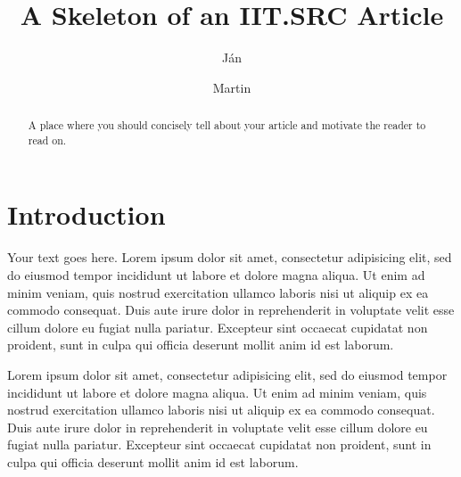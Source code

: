 \documentclass{iitsrc}
\title{A Skeleton of an IIT.SRC Article}
\author{Ján}{Novák}
\author{Martin}{Kováč}
\begin{document}
\begin{abstract}
A place where you should concisely tell about your article and motivate
the reader to read on.
\end{abstract}
\section{Introduction}
Your text goes here. Lorem ipsum dolor sit amet, consectetur adipisicing elit, sed do eiusmod tempor incididunt ut labore et dolore magna aliqua. Ut enim ad minim veniam, quis nostrud exercitation ullamco laboris nisi ut aliquip ex ea commodo consequat. Duis aute irure dolor in reprehenderit in voluptate velit esse cillum dolore eu fugiat nulla pariatur. Excepteur sint occaecat cupidatat non proident, sunt in culpa qui officia deserunt mollit anim id est laborum.

Lorem ipsum dolor sit amet, consectetur adipisicing elit, sed do eiusmod tempor incididunt ut labore et dolore magna aliqua. Ut enim ad minim veniam, quis nostrud exercitation ullamco laboris nisi ut aliquip ex ea commodo consequat. Duis aute irure dolor in reprehenderit in voluptate velit esse cillum dolore eu fugiat nulla pariatur. Excepteur sint occaecat cupidatat non proident, sunt in culpa qui officia deserunt mollit anim id est laborum.

\end{document}
